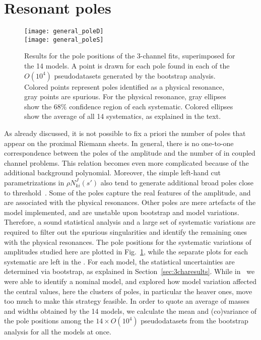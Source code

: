 \section{Resonant poles}
\label{sec:poles}

\begin{table}[b] 
\caption{List of final pole position and uncertainties resulting from the combination of the 14 different final fits to the data. The errors have been obtained as the variance of the full samples, by assuming that the spread of results for each pole, shown in Fig.~\ref{fig:finalpoles}, resembles a Gaussian distribution.}

\label{tab:polesfinal}
\end{table}


\begin{figure}[t]
\centering
\texttt{[image: general\_poleD]} \\ \texttt{[image: general\_poleS]} 
\caption{Results for the pole positions of the 3-channel fits, superimposed for the 14 models. A point is drawn for each pole found in each of the $O(10^4)$ pseudodatasets  generated by the bootstrap analysis. Colored points represent poles identified as a physical resonance, gray points are spurious. For the physical resonance, gray ellipses show the $68\%$ confidence region of each systematic. Colored ellipses show the average of all 14 systematics, as explained in the text.
}
\label{fig:finalpoles}
\end{figure}
As already discussed, it is not possible to fix a priori the number of poles that appear on the proximal Riemann sheets. In general, there is no one-to-one correspondence between the poles of the amplitude and the number of \KCDD in coupled channel problems. This relation becomes even more complicated because of the additional background polynomial. 
Moreover, the simple left-hand cut parametrizations in $\rho N^J_{ki}(s')$ also tend to generate additional broad poles close to threshold~\cite{JPAC:2017dbi}.
Some of the poles capture the real features of the amplitude, and are associated with the physical resonances. Other poles are mere artefacts of the model implemented, and are unstable upon bootstrap and model variations. Therefore, a sound statistical analysis and a large set of systematic variations are required to filter out the spurious singularities and identify the remaining ones with the physical resonances. 
The pole positions for the systematic variations of amplitudes studied here are plotted in Fig.~\ref{fig:finalpoles}, while the separate plots for each systematic are left in the . 
For each model, the statistical uncertainties are determined via bootstrap, as explained in Section~\ref{sec:3charesults}. While in~\cite{JPAC:2018zyd} we were able to identify a nominal model, and explored how model variation affected the central values, here the clusters of poles, in particular the heaver ones, move too much to make this strategy feasible. In order to quote 
an average of masses and widths obtained by the 14 models, we calculate the mean and (co)variance of the pole positions among the $14\times O(10^4)$ 
pseudodatasets from the bootstrap analysis for all the models at once. 

